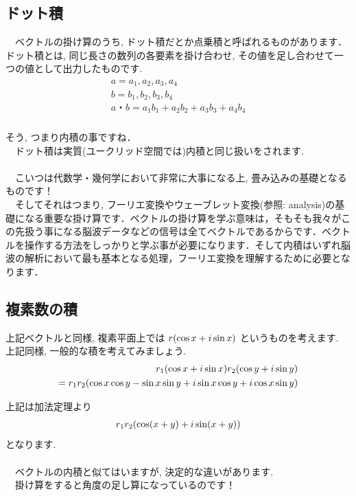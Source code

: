 \documentclass[11pt,a4paper]{jreport}
\begin{document}
\subsection{ドット積}
　ベクトルの掛け算のうち, ドット積だとか点乗積と呼ばれるものがあります．ドット積とは, 同じ長さの数列の各要素を掛け合わせ, その値を足し合わせて一つの値として出力したものです.\\
\begin{eqnarray}
\begin{split}
a = {a_1,a_2,a_3,a_4}\\
b={b_1,b_2,b_3,b_4}\\
a・b = a_1b_1 + a_2b_2 + a_3b_3 + a_4b_4
\end{split}
\end{eqnarray}
\\
そう, つまり内積の事ですね．\\
　ドット積は実質(ユークリッド空間では)内積と同じ扱いをされます.\\
\\
　こいつは代数学・幾何学において非常に大事になる上, 畳み込みの基礎となるものです！\\
　そしてそれはつまり, フーリエ変換やウェーブレット変換(参照: analysis)の基礎になる重要な掛け算です．ベクトルの掛け算を学ぶ意味は，そもそも我々がこの先扱う事になる脳波データなどの信号は全てベクトルであるからです．ベクトルを操作する方法をしっかりと学ぶ事が必要になります．そして内積はいずれ脳波の解析において最も基本となる処理，フーリエ変換を理解するために必要となります．\\

\subsection{複素数の積}
上記ベクトルと同様, 複素平面上では $\mathstrut r (\cos x + \mathstrut i\sin x)$ というものを考えます.\\
上記同様, 一般的な積を考えてみましょう.\\

\begin{eqnarray}
\begin{split}
\mathstrut r_1(\cos x + \mathstrut i\sin x)\mathstrut r_2(\cos y + \mathstrut i\sin y)\\
= \mathstrut r_1\mathstrut r_2(\cos x\cos y - \sin x\sin y + \mathstrut i\sin x \cos y + \mathstrut i\cos x\sin y)
\end{split}
\end{eqnarray}

上記は加法定理より
\begin{eqnarray}
\mathstrut r_1\mathstrut r_2(\cos (\mathstrut x + \mathstrut y) + \mathstrut i\sin (\mathstrut x + \mathstrut y))
\end{eqnarray}
となります.\\
\\
　ベクトルの内積と似てはいますが, 決定的な違いがあります.\\
　掛け算をすると角度の足し算になっているのです！\\
\end{document}
